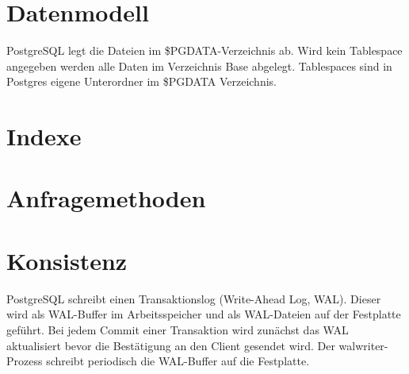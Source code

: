 \section{Datenmodell}
PostgreSQL legt die Dateien im \$PGDATA-Verzeichnis ab. Wird kein Tablespace angegeben werden alle Daten im Verzeichnis Base abgelegt. Tablespaces sind in Postgres eigene Unterordner im \$PGDATA Verzeichnis.
\section{Indexe}
\section{Anfragemethoden}
\section{Konsistenz}
PostgreSQL schreibt einen Transaktionslog (Write-Ahead Log, WAL).
Dieser wird als WAL-Buffer im Arbeitsspeicher und als WAL-Dateien auf der Festplatte geführt.
Bei jedem Commit einer Transaktion wird zunächst das WAL aktualisiert bevor die Bestätigung an den Client gesendet wird.
Der walwriter-Prozess schreibt periodisch die WAL-Buffer auf die Festplatte.

